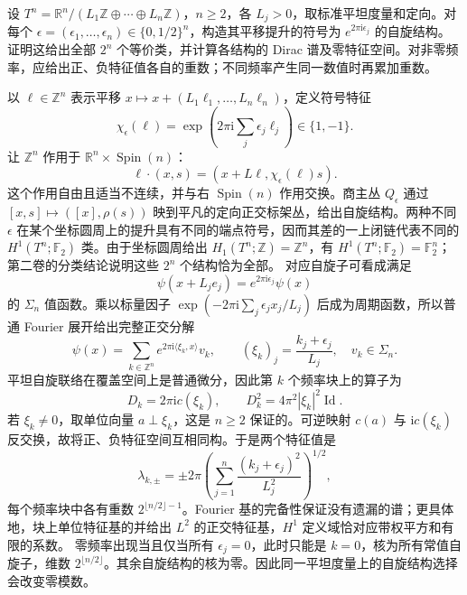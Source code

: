 \begin{optionalexercise}\label{g3:ex:flat-torus-spin-spectrum}
	设 \(T^n=\mathbb R^n/(L_1\mathbb Z\oplus\cdots\oplus L_n\mathbb Z)\)，\(n\ge2\)，各 \(L_j>0\)，取标准平坦度量和定向。对每个 \(\epsilon=(\epsilon_1,\ldots,\epsilon_n)\in\{0,1/2\}^n\)，构造其平移提升的符号为 \(e^{2\pi\mathrm i\epsilon_j}\) 的自旋结构。证明这给出全部 \(2^n\) 个等价类，并计算各结构的 Dirac 谱及零特征空间。对非零频率，应给出正、负特征值各自的重数；不同频率产生同一数值时再累加重数。
\end{optionalexercise}
\begin{solution}
	以 \(\ell\in\mathbb Z^n\) 表示平移 \(x\mapsto x+(L_1\ell_1,\ldots,L_n\ell_n)\)，定义符号特征
	\[
		\chi_\epsilon(\ell)=\exp\left(2\pi\mathrm i\sum_j\epsilon_j\ell_j\right)\in\{1,-1\}.
	\]
	让 \(\mathbb Z^n\) 作用于 \(\mathbb R^n\times\operatorname{Spin}(n)\)：
	\[
		\ell\cdot(x,s)=(x+L\ell,\chi_\epsilon(\ell)s).
	\]
	这个作用自由且适当不连续，并与右 \(\operatorname{Spin}(n)\) 作用交换。商主丛 \(Q_\epsilon\) 通过 \([x,s]\mapsto([x],\rho(s))\) 映到平凡的定向正交标架丛，给出自旋结构。两种不同 \(\epsilon\) 在某个坐标圆周上的提升具有不同的端点符号，因而其差的一上闭链代表不同的 \(H^1(T^n;\mathbb F_2)\) 类。由于坐标圆周给出 \(H_1(T^n;\mathbb Z)=\mathbb Z^n\)，有 \(H^1(T^n;\mathbb F_2)=\mathbb F_2^n\)；第二卷的分类结论说明这些 \(2^n\) 个结构恰为全部。
	对应自旋子可看成满足
	\[
		\psi(x+L_j e_j)=e^{2\pi\mathrm i\epsilon_j}\psi(x)
	\]
	的 \(\Sigma_n\) 值函数。乘以标量因子 \(\exp(-2\pi\mathrm i\sum_j\epsilon_j x_j/L_j)\) 后成为周期函数，所以普通 Fourier 展开给出完整正交分解
	\[
		\psi(x)=\sum_{k\in\mathbb Z^n}e^{2\pi\mathrm i\langle\xi_k,x\rangle}v_k,
		\qquad (\xi_k)_j=\frac{k_j+\epsilon_j}{L_j},\quad v_k\in\Sigma_n.
	\]
	平坦自旋联络在覆盖空间上是普通微分，因此第 \(k\) 个频率块上的算子为
	\[
		D_k=2\pi\mathrm i c(\xi_k),\qquad D_k^2=4\pi^2|\xi_k|^2\operatorname{Id}.
	\]
	若 \(\xi_k\ne0\)，取单位向量 \(a\perp\xi_k\)，这是 \(n\ge2\) 保证的。可逆映射 \(c(a)\) 与 \(\mathrm i c(\xi_k)\) 反交换，故将正、负特征空间互相同构。于是两个特征值是
	\[
		\lambda_{k,\pm}=\pm2\pi\left(\sum_{j=1}^n\frac{(k_j+\epsilon_j)^2}{L_j^2}\right)^{1/2},
	\]
	每个频率块中各有重数 \(2^{\lfloor n/2\rfloor-1}\)。Fourier 基的完备性保证没有遗漏的谱；更具体地，块上单位特征基的并给出 \(L^2\) 的正交特征基，\(H^1\) 定义域恰对应带权平方和有限的系数。
	零频率出现当且仅当所有 \(\epsilon_j=0\)，此时只能是 \(k=0\)，核为所有常值自旋子，维数 \(2^{\lfloor n/2\rfloor}\)。其余自旋结构的核为零。因此同一平坦度量上的自旋结构选择会改变零模数。
\end{solution}

